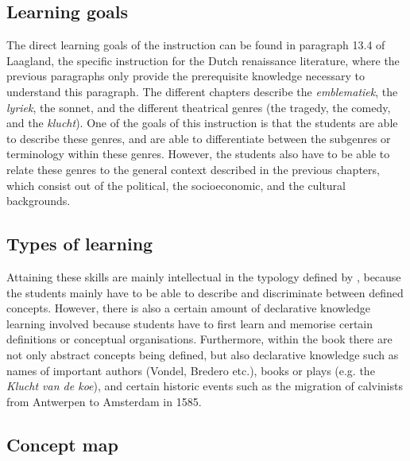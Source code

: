 \subsection{Learning goals}

The direct learning goals of the instruction can be found in paragraph 13.4 of Laagland, the specific instruction for the Dutch renaissance literature, where the previous paragraphs only provide the prerequisite knowledge necessary to understand this paragraph. The different chapters describe the \emph{emblematiek}, the \emph{lyriek}, the sonnet, and the different theatrical genres (the tragedy, the comedy, and the \emph{klucht}). One of the goals of this instruction is that the students are able to describe these genres, and are able to differentiate between the subgenres or terminology within these genres. However, the students also have to be able to relate these genres to the general context described in the previous chapters, which consist out of the political, the socioeconomic, and the cultural backgrounds.

\subsection{Types of learning}

Attaining these skills are mainly intellectual in the typology defined by , because the students mainly have to be able to describe and discriminate between defined concepts. However, there is also a certain amount of declarative knowledge learning involved because students have to first learn and memorise certain definitions or conceptual organisations. Furthermore, within the book there are not only abstract concepts being defined, but also declarative knowledge such as names of important authors (Vondel, Bredero etc.), books or plays (e.g. the \emph{Klucht van de koe}), and certain historic events such as the migration of calvinists from Antwerpen to Amsterdam in 1585.

\subsection{Concept map}

